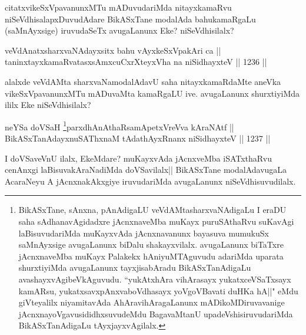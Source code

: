 \begin{artha}
citatxvikeSxVpavanunxMTu mADuvudariMda nitayxkamaRvu niSeVdhisalapxDuvudAdare BikASxTane modalAda bahukamaRgaLu (saMnAyxsige) iruvudaSeTx avugaLanunx Eke? niSeVdhisilalx?
\end{artha}

\begin{shl}
veVdAnatxsharxvaNAdayxsitx bahu vAyxkeSxVpakAri ca ||  \\
taninxtayxkamaRvatasxsAmxcuCxrXteyxVha na niSidhayxteV \hfill || 1236 ||  
\end{shl}

\begin{artha}
alalxde veVdAMta sharxvaNamodalAdavU saha nitayxkamaRdaMte aneVka vikeSxVpavanunxMTu mADuvaMta kamaRgaLU ive. avugaLanunx shurxtiyiMda ililx Eke niSeVdhisilalx?
\end{artha}



\begin{shl}
neYSa doVSaH \footnote{BikASxTane, sAnxna, pAnAdigaLU veVdAMtasharxvaNAdigaLu I eraDU saha sAdhanavAgidadxre jAcnxnaveMba muKayx puruSAthaRvu suKavAgi laBisuvudariMda muKayxvAda jAcnxnavanunx bayasuva mumukuSx saMnAyxsige avugaLanunx biDalu shakayxvilalx. avugaLanunx biTaTxre jAcnxnaveMba muKayx Palakekx hAniyuMTAguvudu adariMda uparata shurxtiyiMda avugaLanunx tayxjisabAradu BikASxTanAdigaLu avashayxvAgibeVkAguvudu. ``yukAtxhAra vihArasayx yukatxceVSaTxsayx kamARsu, yukatxsavxpAnxvaboVdhasayx yoVgoVBavati duHKa hA||" eMdu giVteyalilx niyamitavAda AhAravihAragaLanunx mADikoMDiruvavanige jAcnxnayoVgavusididhxsuvudeMdu BagavaMtanU upadeVshisiruvudariMda BikASxTanAdigaLu tAyxjayxvAgilalx.}parxdhAnAthaRsamApetxVreVva kAraNAtf || \\
BikASxTanAdayxnuSAThxnaM tAdathAyxRnanx niSidhayxteV \hfill || 1237 ||  
\end{shl}

\begin{artha}
I doVSaveVnU ilalx, EkeMdare? muKayxvAda jAcnxveMba iSATxthaRvu cenAnxgi laBisuvakAraNadiMda doVSavilalx|| BikASxTane modalAdavugaLa AcaraNeyu A jAcnxnakAkxgiye iruvudariMda avugaLanunx niSeVdhisuvudilalx.
\end{artha}


